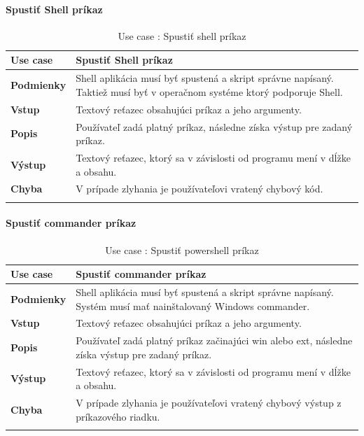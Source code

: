 \paragraph{Spustiť Shell príkaz}
\begin{center}
	\begin{longtable}{|p{2.5cm}|p{12.2cm}|}

			\hline
			\textbf{Use case} & Spustiť Shell príkaz \\ 
			\hline
			\textbf{Podmienky} & Shell aplikácia musí byť spustená a skript správne napísaný. Taktiež musí byť v operačnom systéme ktorý podporuje Shell. \\ 
			\hline
			\textbf{Vstup} & Textový reťazec obsahujúci príkaz a jeho argumenty.\\
			\hline
			\textbf{Popis} & Používateľ zadá platný príkaz, následne získa výstup pre zadaný príkaz. \\ 
			\hline
			\textbf{Výstup} &Textový reťazec, ktorý sa v závislosti od programu mení v dĺžke a obsahu. \\
			\hline
			\textbf{Chyba} & V prípade zlyhania je používateľovi vratený chybový kód.\\
			\hline
		\caption{Use case : Spustiť shell príkaz}
	\label{table:1}
	
	\end{longtable}
\end{center}

\paragraph{Spustiť commander príkaz}
\begin{center}
	\begin{longtable}{|p{2.5cm}|p{12.2cm}|}

			\hline
			\textbf{Use case} & Spustiť commander príkaz \\ 
			\hline
			\textbf{Podmienky} & Shell aplikácia musí byť spustená a skript správne napísaný. Systém musí mať nainštalovaný Windows commander.\\ 
			\hline
			\textbf{Vstup} & Textový reťazec obsahujúci príkaz a jeho argumenty.\\
			\hline
			\textbf{Popis} & Používateľ zadá platný príkaz začinajúci win alebo ext, následne získa výstup pre zadaný príkaz. \\ 
			\hline
			\textbf{Výstup} &Textový reťazec, ktorý sa v závislosti od programu mení v dĺžke a obsahu. \\
			\hline
			\textbf{Chyba} & V prípade zlyhania je používateľovi vratený chybový výstup z príkazového riadku.\\
			\hline
	\caption{Use case : Spustiť powershell príkaz}
	\label{table:1}

	\end{longtable}
\end{center}
